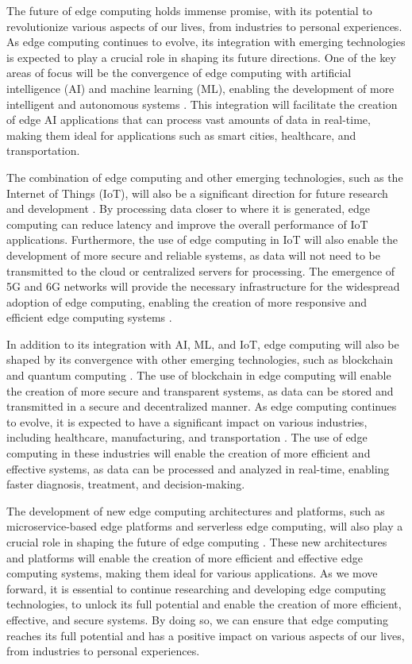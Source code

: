 \documentclass[11pt]{article}
\begin{document}
The future of edge computing holds immense promise, with its potential to revolutionize various aspects of our lives, from industries to personal experiences. As edge computing continues to evolve, its integration with emerging technologies is expected to play a crucial role in shaping its future directions. One of the key areas of focus will be the convergence of edge computing with artificial intelligence (AI) and machine learning (ML), enabling the development of more intelligent and autonomous systems \cite{ref28}. This integration will facilitate the creation of edge AI applications that can process vast amounts of data in real-time, making them ideal for applications such as smart cities, healthcare, and transportation.

The combination of edge computing and other emerging technologies, such as the Internet of Things (IoT), will also be a significant direction for future research and development \cite{ref2}. By processing data closer to where it is generated, edge computing can reduce latency and improve the overall performance of IoT applications. Furthermore, the use of edge computing in IoT will also enable the development of more secure and reliable systems, as data will not need to be transmitted to the cloud or centralized servers for processing. The emergence of 5G and 6G networks will provide the necessary infrastructure for the widespread adoption of edge computing, enabling the creation of more responsive and efficient edge computing systems \cite{ref76}.

In addition to its integration with AI, ML, and IoT, edge computing will also be shaped by its convergence with other emerging technologies, such as blockchain and quantum computing \cite{ref77}. The use of blockchain in edge computing will enable the creation of more secure and transparent systems, as data can be stored and transmitted in a secure and decentralized manner. As edge computing continues to evolve, it is expected to have a significant impact on various industries, including healthcare, manufacturing, and transportation \cite{ref78}. The use of edge computing in these industries will enable the creation of more efficient and effective systems, as data can be processed and analyzed in real-time, enabling faster diagnosis, treatment, and decision-making.

The development of new edge computing architectures and platforms, such as microservice-based edge platforms and serverless edge computing, will also play a crucial role in shaping the future of edge computing \cite{ref79}. These new architectures and platforms will enable the creation of more efficient and effective edge computing systems, making them ideal for various applications. As we move forward, it is essential to continue researching and developing edge computing technologies, to unlock its full potential and enable the creation of more efficient, effective, and secure systems. By doing so, we can ensure that edge computing reaches its full potential and has a positive impact on various aspects of our lives, from industries to personal experiences.
\end{document}
